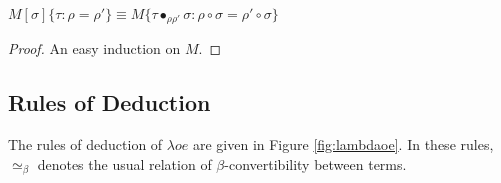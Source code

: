 \documentclass[a4paper,UKenglish]{lipics-v2016}
\theoremstyle{plain}
\begin{document}
\begin{lemma}
\label{lm:pathsubsub}
$M[\sigma]\{ \tau : \rho = \rho' \} \equiv
M\{ \tau \bullet_{\rho \rho'} \sigma : \rho \circ \sigma = \rho' \circ \sigma \}$
\end{lemma}

\begin{proof}
An easy induction on $M$.
\end{proof}

\subsection{Rules of Deduction}

The rules of deduction of $\lambda o e$ are given in Figure \ref{fig:lambdaoe}.  In these rules, $\simeq_\beta$ denotes the usual relation of $\beta$-convertibility between terms.
\end{document}
